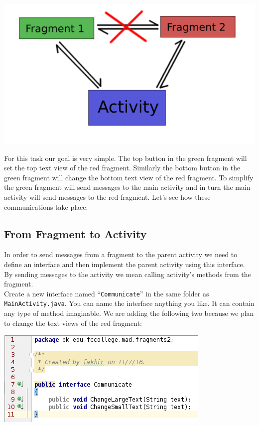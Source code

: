 \begin{center}
	\includegraphics[scale=0.3]{chapters/ch11/images/24}
\end{center}

For this task our goal is very simple. The top button in the green fragment will set the top text view of the red fragment. Similarly the bottom button in the green fragment will change the bottom text view of the red fragment. To simplify the green fragment will send messages to the main activity and in turn the main activity will send messages to the red fragment. Let's see how these communications take place.

\subsection{From Fragment to Activity}
\label{FRAG:fromFragmentToActivity}

In order to send messages from a fragment to the parent activity we need to define an interface and then implement the parent activity using this interface. By sending messages to the activity we mean calling activity's methods from the fragment. \\

Create a new interface named ``\texttt{Communicate}'' in the same folder as \texttt{MainActivity.java}. You can name the interface anything you like. It can contain any type of method imaginable. We are adding the following two because we plan to change the text views of the red fragment:

\begin{center}
	\includegraphics[scale=\SourceCodeScale]{chapters/ch11/images/25}
\end{center}

